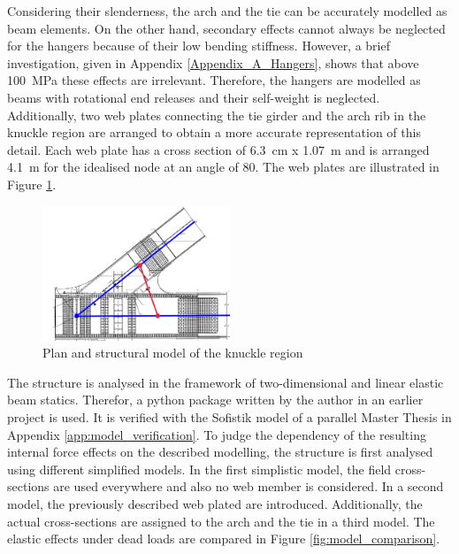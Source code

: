 Considering their slenderness, the arch and the tie can be accurately modelled as beam elements. On the other hand, secondary effects cannot always be neglected for the hangers because of their low bending stiffness. However, a brief investigation, given in Appendix \ref{Appendix_A_Hangers}, shows that above \SI{100}{MPa} these effects are irrelevant. Therefore, the hangers are modelled as beams with rotational end releases and their self-weight is neglected. Additionally, two web plates connecting the tie girder and the arch rib in the knuckle region are arranged to obtain a more accurate representation of this detail. Each web plate has a cross section of \SI{6.3}{cm} x \SI{1.07}{m} and is arranged \SI{4.1}{m} for the idealised node at an angle of 80\degree. The web plates are illustrated in Figure \ref{fig:knuckle_region}.



\begin{figure}[H]
    \centering
    \includegraphics[width=0.5\textwidth]{overleaf/Pictures/Knuckle region.png}
    \caption{Plan and structural model of the knuckle region}
    \label{fig:knuckle_region}
\end{figure}

The structure is analysed in the framework of two-dimensional and linear elastic beam statics. Therefor, a python package written by the author in an earlier project is used. It is verified with the Sofistik model of a parallel Master Thesis in Appendix \ref{app:model_verification}. To judge the dependency of the resulting internal force effects on the described modelling, the structure is first analysed using different simplified models. In the first simplistic model, the field cross-sections are used everywhere and also no web member is considered. In a second model, the previously described web plated are introduced. Additionally, the actual cross-sections are assigned to the arch and the tie in a third model. The elastic effects under dead loads are compared in Figure \ref{fig:model_comparison}.

